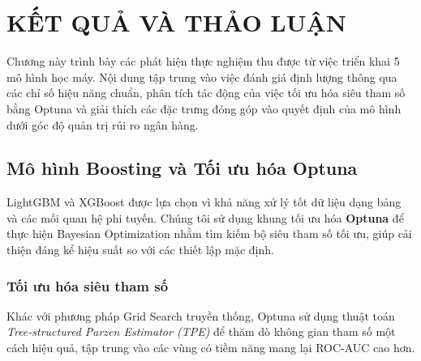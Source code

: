 
\chapter{KẾT QUẢ VÀ THẢO LUẬN}
Chương này trình bày các phát hiện thực nghiệm thu được từ việc triển khai 5 mô hình học máy. Nội dung tập trung vào việc đánh giá định lượng thông qua các chỉ số hiệu năng chuẩn, phân tích tác động của việc tối ưu hóa siêu tham số bằng Optuna và giải thích các đặc trưng đóng góp vào quyết định của mô hình dưới góc độ quản trị rủi ro ngân hàng.

\section{Mô hình Boosting và Tối ưu hóa Optuna}
LightGBM và XGBoost được lựa chọn vì khả năng xử lý tốt dữ liệu dạng bảng và các mối quan hệ phi tuyến. Chúng tôi sử dụng khung tối ưu hóa \textbf{Optuna} để thực hiện Bayesian Optimization nhằm tìm kiếm bộ siêu tham số tối ưu, giúp cải thiện đáng kể hiệu suất so với các thiết lập mặc định.

\subsection{Tối ưu hóa siêu tham số }
Khác với phương pháp Grid Search truyền thống, Optuna sử dụng thuật toán \textit{Tree-structured Parzen Estimator (TPE)} để thăm dò không gian tham số một cách hiệu quả, tập trung vào các vùng có tiềm năng mang lại ROC-AUC cao hơn.


